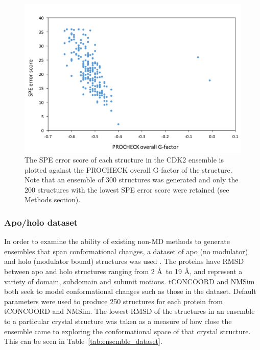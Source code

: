 \begin{figure}
\centering

\includegraphics[width=\textwidth]{figures/score_procheck/score_procheck}

\caption{The SPE error score of each structure in the CDK2 ensemble is plotted against the PROCHECK overall G-factor of the structure.
Note that an ensemble of 300 structures was generated and only the 200 structures with the lowest SPE error score were retained (see Methods section).}

\label{fig:score_procheck}
\end{figure}


\subsubsection{Apo/holo dataset}

In order to examine the ability of existing non-MD methods to generate ensembles that span conformational changes, a dataset of apo (no modulator) and holo (modulator bound) structures was used \cite{Atilgan2010}.
The proteins have RMSD between apo and holo structures ranging from 2 \AA\ to 19 \AA, and represent a variety of domain, subdomain and subunit motions.
tCONCOORD \cite{Seeliger2007} and NMSim \cite{Kruger2012} both seek to model conformational changes such as those in the dataset.
Default parameters were used to produce 250 structures for each protein from tCONCOORD and NMSim.
The lowest RMSD of the structures in an ensemble to a particular crystal structure was taken as a measure of how close the ensemble came to exploring the conformational space of that crystal structure.
This can be seen in Table~\ref{tab:ensemble_dataset}.

